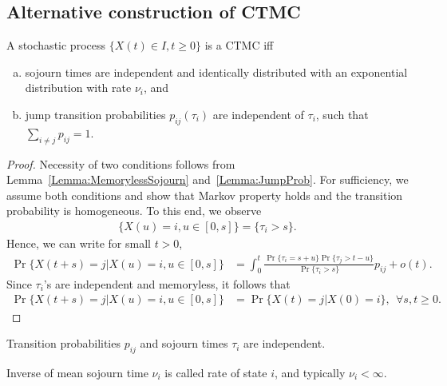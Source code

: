 \documentclass[a4paper,10pt,english]{article}
\begin{document}
\subsection{Alternative construction of CTMC}
\begin{prop} A stochastic process $\{X(t) \in I, t \geqslant 0 \}$ is a CTMC iff 
\begin{enumerate}[a.]
\item sojourn times are independent and identically distributed with an exponential distribution with rate $\nu_i$, and 
\item jump transition probabilities $p_{ij}(\tau_i)$ are independent of $\tau_i$, such that $\sum_{i \neq j}p_{ij}=1$.
\end{enumerate}
\end{prop}
\begin{proof}
Necessity of two conditions follows from Lemma~\ref{Lemma:MemorylessSojourn} and~\ref{Lemma:JumpProb}. 
For sufficiency, we assume both conditions and show that Markov property holds and the transition probability is homogeneous. 
To this end, we observe
\begin{align*}
\{ X(u) = i, u \in [0,s] \} = \{ \tau_i > s \}.
\end{align*}
Hence, we can write for small $t > 0$, 
\begin{align*}
\Pr\{ X(t+s) = j | X(u) = i, u \in [0,s] \} 
&= \int_0^{t}\frac{\Pr\{\tau_i = s+u\}\Pr\{\tau_j > t-u\}}{\Pr\{\tau_i > s\}}p_{ij} + o(t).
\end{align*}
Since $\tau_i$'s are independent and memoryless, it follows that
\begin{align*}
\Pr\{ X(t+s) = j | X(u) = i, u \in [0,s] \} 
&= \Pr\{X(t) = j | X(0) = i\}, ~~\forall s, t \geqslant 0.
\end{align*}
\end{proof}
\begin{rem}
Transition probabilities $p_{ij}$ and sojourn times $\tau_i$ are independent. 
\end{rem}
\begin{rem} Inverse of mean sojourn time $\nu_i$ is called rate of state $i$, and typically $\nu_i < \infty$.  
\end{rem}
\end{document}
